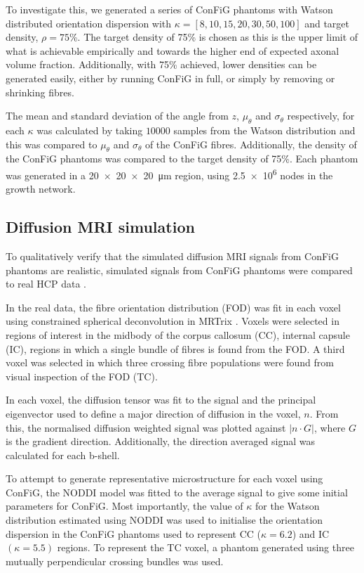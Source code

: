 To investigate this, we generated a series of ConFiG phantoms with Watson distributed orientation dispersion with $\kappa=[8,10,15,20,30,50,100]$ and target density, $\rho = 75$\%. The target density of 75\% is chosen as this is the upper limit of what is achievable empirically and towards the higher end of expected axonal volume fraction. Additionally, with 75\% achieved, lower densities can be generated easily, either by running ConFiG in full, or simply by removing or shrinking fibres.

The mean and standard deviation of the angle from $z$, $\mu_\theta$ and $\sigma_\theta$ respectively, for each $\kappa$ was calculated by taking $10000$ samples from the Watson distribution and this was compared to $\mu_\theta$ and $\sigma_\theta$ of the ConFiG fibres. Additionally, the density of the ConFiG phantoms was compared to the target density of 75\%. Each phantom was generated in a \SI{20 x 20 x 20}{\micro\metre} region, using \num{2.5e6} nodes in the growth network.

\subsection{Diffusion MRI simulation}
\label{sec:config_diffusion_sim}
To qualitatively verify that the simulated diffusion MRI signals from ConFiG phantoms are realistic, simulated signals from ConFiG phantoms were compared to real HCP data \cite{Sotiropoulos2013a,VanEssen2012}.

In the real data, the fibre orientation distribution (FOD) was fit in each voxel using constrained spherical deconvolution in MRTrix \cite{Tournier2019,Tournier2007}. Voxels were selected in regions of interest in the midbody of the corpus callosum (CC), internal capsule (IC), regions in which a single bundle of fibres is found from the FOD. A third voxel was selected in which three crossing fibre populations were found from visual inspection of the FOD (TC).

In each voxel, the diffusion tensor was fit to the signal and the principal eigenvector used to define a major direction of diffusion in the voxel, $n$. From this, the normalised diffusion weighted signal was plotted against $|n\cdot G|$, where $G$ is the gradient direction. Additionally, the direction averaged signal was calculated for each b-shell.

To attempt to generate representative microstructure for each voxel using ConFiG, the NODDI model \cite{Zhang2012} was fitted to the average signal to give some initial parameters for ConFiG. Most importantly, the value of $\kappa$ for the Watson distribution \cite{Mardia2008} estimated using NODDI was used to initialise the orientation dispersion in the ConFiG phantoms used to represent CC ($\kappa=6.2$) and IC $(\kappa=5.5)$ regions. To represent the TC voxel, a phantom generated using three mutually perpendicular crossing bundles was used.

